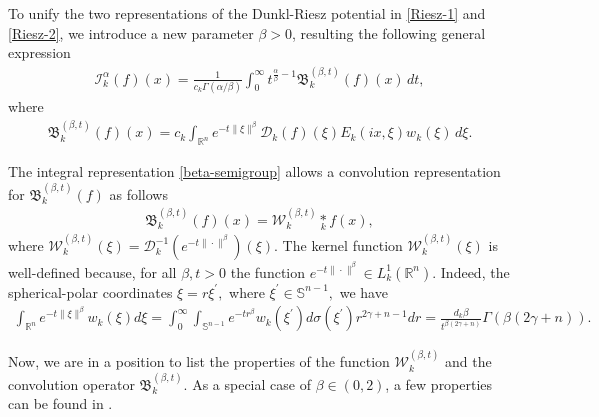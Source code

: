 \documentclass[11pt,a4paper,reqno]{amsproc}
\theoremstyle{definition}
\theoremstyle{remark}
\numberwithin{equation}{section}
\begin{document}
To unify the two representations of the Dunkl-Riesz potential in  \eqref{Riesz-1} and \eqref{Riesz-2}, we introduce a new parameter $\beta>0$, resulting the following general expression 
\begin{align}\label{Riesz-beta}
\mathcal{I}_k^\alpha (f)(x) = \frac{1}{c_k\Gamma(\alpha / \beta)} \int_0^{\infty} t^{\frac{\alpha}{\beta}-1} \mathfrak{B}_k^{(\beta, t)} (f)(x)\,dt,
\end{align}
where 
\begin{align} \label{beta-semigroup}
\mathfrak{B}_k^{(\beta, t)} (f)(x) = c_k \int_{\mathbb{R}^n} e^{-t\|\xi\|^\beta} \mathcal{D}_k (f)(\xi) E_k(ix, \xi) w_k(\xi)\,d\xi.
\end{align} 

The integral representation \eqref{beta-semigroup} allows a convolution representation for $\mathfrak{B}_k^{(\beta,t)}(f)$  as follows
\begin{align} \label{beta-convolution}
    \mathfrak{B}_k^{(\beta,t)}(f)(x)= \mathcal{W}_k^{(\beta,t)} \underset{k}{\ast} f(x),
\end{align}
 where $\mathcal{W}_k^{(\beta,t)}(\xi)=\mathcal{D}_k^{-1}(e^{-t\|\cdot\|^{\beta}})(\xi)$. The kernel function $\mathcal{W}_k^{(\beta,t)}(\xi)$ is well-defined because, for all $\beta, t>0$ the function $e^{-t\|\cdot\|^{\beta}}\in L_k^1(\mathbb{R}^n)$. Indeed, the spherical-polar coordinates $\xi=r\xi^\prime,$ where $\xi^\prime\in \mathbb{S}^{n-1},$ we have
 \begin{align*}
     \int_{\mathbb{R}^n} e^{-t\|\xi\|^{\beta}} w_k(\xi)d\xi =  \int_0^{\infty} \int_{\mathbb{S}^{n-1}} e^{-tr^\beta}w_k(\xi^\prime)d\sigma(\xi^\prime) r^{2\gamma+n-1}dr= 
     \frac{ d_k \beta }{t^{\beta(2\gamma+n)}} \Gamma\left(\beta(2\gamma+n)\right).
  \end{align*}  
 
\noindent Now, we are in a position to list the properties of the function $\mathcal{W}_k^{(\beta,t)}$ and the convolution operator $\mathfrak{B}_k^{(\beta,t)}$. As a special case of $\beta\in (0,2)$, a few properties can be found in \cite{Rejeb}.
\end{document}
